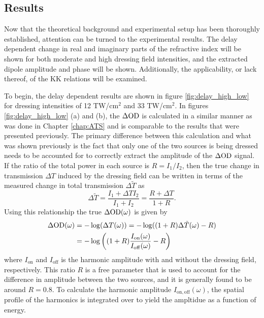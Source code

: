 \subsection{Results}
\label{sec:CATS_ar_results}

Now that the theoretical background and experimental setup has been thoroughly established, attention can be turned to the experimental results.  The delay dependent change in real and imaginary parts of the refractive index will be shown for both moderate and high dressing field intensities, and the extracted dipole amplitude and phase will be shown. Additionally, the applicability, or lack thereof, of the KK relations will be examined.

To begin, the delay dependent results are shown in figure \ref{fig:delay_high_low} for dressing intensities of 12 TW/cm$^2$ and 33 TW/cm$^2$. In figures \ref{fig:delay_high_low} (a) and (b), the $\Delta\mathrm{OD}$ is calculated in a similar manner as was done in Chapter \ref{chap:ATS}  and is comparable to the results that were presented previously. The primary difference between this calculation and what was shown previously is the fact that only one of the two sources is being dressed needs to be accounted for to correctly extract the amplitude of the $\Delta\mathrm{OD}$ signal.  If the ratio of the total power in each source is $R=I_1/I_2$, then the true change in transmission $\Delta T$ induced by the dressing field can be written in terms of the measured change in total transmission $\Delta \tilde{T}$ as
\begin{equation}
	\label{eqn:dod_fringe_shift}
	\Delta \tilde{T} = \frac{I_1 + \Delta T I_2}{I_1 + I_2} = \frac{R + \Delta T}{1+ R}.
\end{equation}
Using this relationship the true $\Delta\mathrm{OD}(\omega)$ is given by 
\begin{equation}
	\label{eqn:dod_R}
	\begin{aligned}
		\Delta\mathrm{OD}(\omega) & = -\log(\Delta T(\omega)) = -\log((1+R)\Delta \tilde{T}(\omega) - R) \\
		&= -\log\bigg((1+R)\frac{I_{\mathrm{on}}(\omega)}{I_{\mathrm{off}}(\omega)} - R\bigg)
	\end{aligned}
\end{equation}
where $I_{\mathrm{on}}$ and $I_{\mathrm{off}}$ is the harmonic amplitude with and without the dressing field, respectively.  This ratio $R$ is a free parameter that is used to account for the difference in amplitude between the two sources, and it is generally found to be around $R=0.8$.  To calculate the harmonic amplitude $I_{\mathrm{on,off}}(\omega)$, the spatial profile of the harmonics is integrated over to yield the ampltidue as a function of energy.

